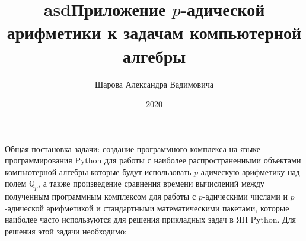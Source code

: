 \documentclass[master, och, times, assignment]{sty/SCWorks}
\begin{document}
\title{asd}
\title{Приложение $p$-адической арифметики к задачам компьютерной алгебры}
\author{Шарова Александра Вадимовича}







\date{2020}

\maketitle

Общая постановка задачи: создание программного комплекса на языке программирования Python для работы с наиболее распространенными объектами компьютерной алгебры которые будут использовать $p$-адическую арифметику над полем $\mathbb{Q}_p$, а также произведение сравнения времени вычислений между полученным программным комплексом для работы с $p$-адическими числами и $p$-адической арифметикой и стандартными математическими пакетами, которые наиболее часто используются для решения прикладных задач в ЯП Python. Для решения этой задачи необходимо:
\end{document}
